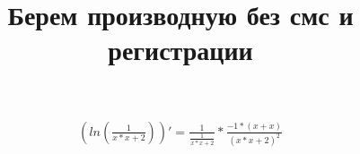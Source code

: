 \documentclass{article}
\title{Берем производную без смс и регистрации}
\begin{document}
\maketitle
\begin{eqnarray}
\left( ln\left(\frac{{1}}{{{{x}*{x}}+{2}}}\right)\right) ' = 
{\frac{{1}}{\frac{{1}}{{{{x}*{x}}+{2}}}}*\frac{{{-1}*\left({{x}+{x}}\right)}}{{\left({{{x}*{x}}+{2}}\right)}^{{2}}}}\end{eqnarray}
\end{document}
